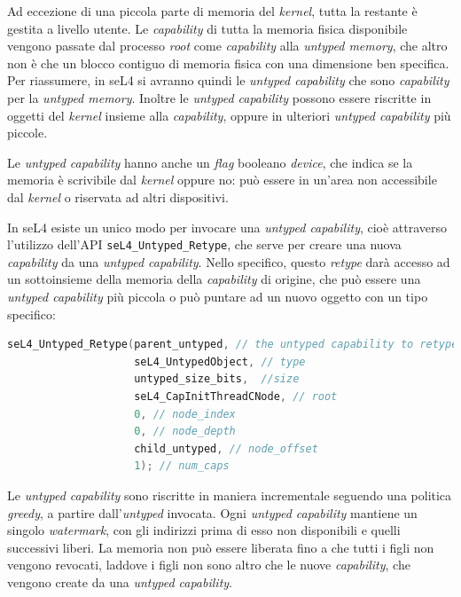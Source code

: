 Ad eccezione di una piccola parte di memoria del \textit{kernel}, tutta la restante è gestita a livello utente. Le \textit{capability} di tutta la memoria fisica disponibile vengono passate dal processo \textit{root} come \textit{capability} alla \textit{untyped memory}, che altro non è che un blocco contiguo di memoria fisica con una dimensione ben specifica. Per riassumere, in seL4 si avranno quindi le \textit{untyped capability} che sono \textit{capability} per la \textit{untyped memory}. Inoltre le \textit{untyped capability} possono essere riscritte in oggetti del \textit{kernel} insieme alla \textit{capability}, oppure in ulteriori \textit{untyped capability} più piccole.

Le \textit{untyped capability} hanno anche un \textit{flag} booleano \textit{device}, che indica se la memoria è scrivibile dal \textit{kernel} oppure no: può essere in un'area non accessibile dal \textit{kernel} o riservata ad altri dispositivi.

In seL4 esiste un unico modo per invocare una \textit{untyped capability}, cioè attraverso l'utilizzo dell'API \texttt{seL4\_Untyped\_Retype}, che serve per creare una nuova \textit{capability} da una \textit{untyped capability}. Nello specifico, questo \textit{retype} darà accesso ad un sottoinsieme della memoria della \textit{capability} di origine, che può essere una \textit{untyped capability} più piccola o può puntare ad un nuovo oggetto con un tipo specifico:
\begin{lstlisting}[language=C++]
seL4_Untyped_Retype(parent_untyped, // the untyped capability to retype
                    seL4_UntypedObject, // type
                    untyped_size_bits,  //size
                    seL4_CapInitThreadCNode, // root
                    0, // node_index
                    0, // node_depth
                    child_untyped, // node_offset
                    1); // num_caps
\end{lstlisting}

Le \textit{untyped capability} sono riscritte in maniera incrementale seguendo una politica \textit{greedy}, a partire dall'\textit{untyped} invocata. Ogni \textit{untyped capability} mantiene un singolo \textit{watermark}, con gli indirizzi prima di esso non disponibili e quelli successivi liberi. La memoria non può essere liberata fino a che tutti i figli non vengono revocati, laddove i figli non sono altro che le nuove \textit{capability}, che vengono create da una \textit{untyped capability}.

